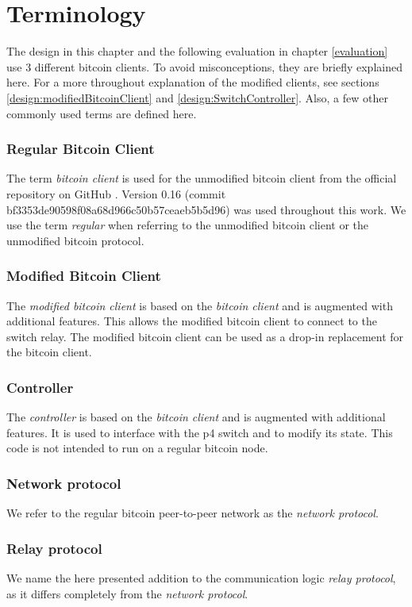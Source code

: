 \section{Terminology}
The design in this chapter and the following evaluation in chapter \ref{evaluation} use 3 different bitcoin clients. To avoid misconceptions, they are briefly explained here. For a more throughout explanation of the modified clients, see sections \ref{design:modifiedBitcoinClient} and \ref{design:SwitchController}. Also, a few other commonly used terms are defined here.
\subsubsection{Regular Bitcoin Client}
The term \textit{bitcoin client} is used for the unmodified bitcoin client from the official repository on GitHub \cite{bitcoinRepo}. Version 0.16 (commit bf3353de90598f08a68d966c50b57ceaeb5b5d96) was used throughout this work. We use the term \textit{regular} when referring to the unmodified bitcoin client or the unmodified bitcoin protocol.
\subsubsection{Modified Bitcoin Client}
The \textit{modified bitcoin client} is based on the \textit{bitcoin client} and is augmented with additional features. This allows the modified bitcoin client to connect to the switch relay. The modified bitcoin client can be used as a drop-in replacement for the bitcoin client.
\subsubsection{Controller}
The \textit{controller} is based on the \textit{bitcoin client} and is augmented with additional features. It is used to interface with the p4 switch and to modify its state. This code is not intended to run on a regular bitcoin node.
\subsubsection{Network protocol}
We refer to the regular bitcoin peer-to-peer network as the \textit{network protocol}. 
\subsubsection{Relay protocol}
We name the here presented addition to the communication logic \textit{relay protocol}, as it differs completely from the \textit{network protocol}.




